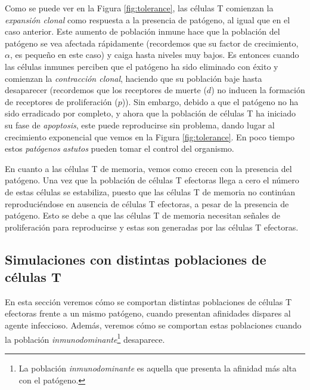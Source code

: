 Como se puede ver en la Figura \ref{fig:tolerance}, las células T comienzan la \textit{expansión clonal} como respuesta a la presencia de patógeno, al igual que en el caso anterior. Este aumento de población inmune hace que la población del patógeno se vea afectada rápidamente (recordemos que su factor de crecimiento, $\alpha$, es pequeño en este caso) y caiga hasta niveles muy bajos. Es entonces cuando las células inmunes perciben que el patógeno ha sido eliminado con éxito y comienzan la \textit{contracción clonal}, haciendo que su población baje hasta desaparecer (recordemos que los receptores de muerte ($d$) no inducen la formación de receptores de proliferación ($p$)). Sin embargo, debido a que el patógeno no ha sido erradicado por completo, y ahora que la población de células T ha iniciado su fase de \textit{apoptosis}, este puede reproducirse sin problema, dando lugar al crecimiento exponencial que vemos en la Figura \ref{fig:tolerance}. En poco tiempo estos \textit{patógenos} \textit{astutos} pueden tomar el control del organismo. 

En cuanto a las células T de memoria, vemos como crecen con la presencia del patógeno. Una vez que la población de células T efectoras llega a cero el número de estas células se estabiliza, puesto que las células T de memoria no continúan reproduciéndose en ausencia de células T efectoras, a pesar de la presencia de patógeno. Esto se debe a que las células T de memoria necesitan señales de proliferación para reproducirse y estas son generadas por las células T efectoras. 


\subsection{Simulaciones con distintas poblaciones de células T}
\label{sim:difPoblacionesT}

En esta sección veremos cómo se comportan distintas poblaciones de células T efectoras frente a un mismo patógeno, cuando presentan afinidades dispares al agente infeccioso. Además, veremos cómo se comportan estas poblaciones cuando la población \textit{inmunodominante}\footnote{La población \textit{inmunodominante} es aquella que presenta la afinidad más alta con el patógeno.} desaparece.

